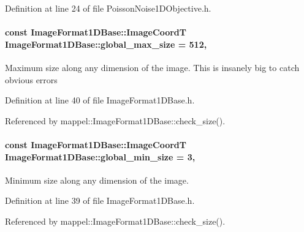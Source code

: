 Definition at line 24 of file Poisson\+Noise1\+D\+Objective.\+h.

\paragraph[{\texorpdfstring{global\+\_\+max\+\_\+size}{global_max_size}}]{\setlength{\rightskip}{0pt plus 5cm}const {\bf Image\+Format1\+D\+Base\+::\+Image\+CoordT} Image\+Format1\+D\+Base\+::global\+\_\+max\+\_\+size = 512\hspace{0.3cm}{\ttfamily [static]}, {\ttfamily [inherited]}}\hypertarget{classmappel_1_1ImageFormat1DBase_a5aafad20e635eae6f3609af56abad3ad}{}\label{classmappel_1_1ImageFormat1DBase_a5aafad20e635eae6f3609af56abad3ad}
Maximum size along any dimension of the image. This is insanely big to catch obvious errors 

Definition at line 40 of file Image\+Format1\+D\+Base.\+h.



Referenced by mappel\+::\+Image\+Format1\+D\+Base\+::check\+\_\+size().

\paragraph[{\texorpdfstring{global\+\_\+min\+\_\+size}{global_min_size}}]{\setlength{\rightskip}{0pt plus 5cm}const {\bf Image\+Format1\+D\+Base\+::\+Image\+CoordT} Image\+Format1\+D\+Base\+::global\+\_\+min\+\_\+size = 3\hspace{0.3cm}{\ttfamily [static]}, {\ttfamily [inherited]}}\hypertarget{classmappel_1_1ImageFormat1DBase_a27c75df8b3d83856d7c2c42ee987af89}{}\label{classmappel_1_1ImageFormat1DBase_a27c75df8b3d83856d7c2c42ee987af89}
Minimum size along any dimension of the image. 

Definition at line 39 of file Image\+Format1\+D\+Base.\+h.



Referenced by mappel\+::\+Image\+Format1\+D\+Base\+::check\+\_\+size().

